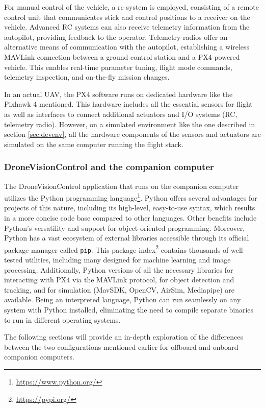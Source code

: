 For manual control of the vehicle, a \acrfull{rc} system is employed, consisting of a remote control unit that communicates stick and control positions to a receiver on the vehicle. Advanced RC systems can also receive telemetry information from the autopilot, providing feedback to the operator. Telemetry radios offer an alternative means of communication with the autopilot, establishing a wireless MAVLink connection between a ground control station and a PX4-powered vehicle. This enables real-time parameter tuning, flight mode commands, telemetry inspection, and on-the-fly mission changes.

In an actual UAV, the PX4 software runs on dedicated hardware like the Pixhawk 4 mentioned. This hardware includes all the essential sensors for flight as well as interfaces to connect additional actuators and I/O systems (RC, telemetry radio). 
However, on a simulated environment like the one described in section \ref{sec:devenv}, all the hardware components of the sensors and actuators are simulated on the same computer running the flight stack.

\subsubsection{DroneVisionControl and the companion computer}

The DroneVisionControl application that runs on the companion computer utilizes the Python programming language\footnote{\url{https://www.python.org/}}. Python offers several advantages for projects of this nature, including its high-level, easy-to-use syntax, which results in a more concise code base compared to other languages. Other benefits include Python's versatility and support for object-oriented programming. Moreover, Python has a vast ecosystem of external libraries accessible through its official package manager called \texttt{pip}. This package index\footnote{\url{https://pypi.org/}} contains thousands of well-tested utilities, including many designed for machine learning and image processing. Additionally, Python versions of all the necessary libraries for interacting with PX4 via the MAVLink protocol, for object detection and tracking, and for simulation (MavSDK, OpenCV, AirSim, Mediapipe) are available. Being an interpreted language, Python can run seamlessly on any system with Python installed, eliminating the need to compile separate binaries to run in different operating systems.

The following sections will provide an in-depth exploration of the differences between the two configurations mentioned earlier for offboard and onboard companion computers.

